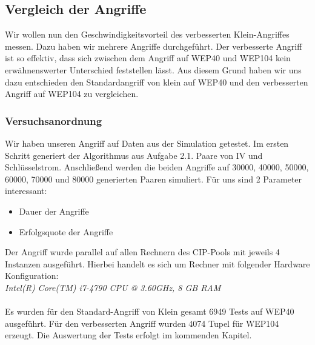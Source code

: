 \documentclass[10pt,a4paper]{article}
\begin{document}
\subsection{Vergleich der Angriffe}\label{ssec:vergleich}
Wir wollen nun den Geschwindigkeitsvorteil des verbesserten Klein-Angriffes messen. Dazu haben wir mehrere Angriffe durchgeführt. Der verbesserte Angriff ist so effektiv, dass sich zwischen dem Angriff auf WEP40 und WEP104 kein erwähnenswerter Unterschied feststellen lässt. Aus diesem Grund haben wir uns dazu entschieden den Standardangriff von klein auf WEP40 und den verbesserten Angriff auf WEP104 zu vergleichen.
\subsubsection{Versuchsanordnung}
Wir haben unseren Angriff auf Daten aus der Simulation getestet. Im ersten Schritt generiert der Algorithmus aus Aufgabe 2.1. Paare von IV und Schlüsselstrom. Anschließend werden die beiden Angriffe auf 30000, 40000, 50000, 60000, 70000 und 80000 generierten Paaren simuliert. Für uns sind 2 Parameter interessant: 
\begin{itemize}
	\item Dauer der Angriffe
	\item Erfolgsquote der Angriffe
\end{itemize}
Der Angriff wurde parallel auf allen Rechnern des CIP-Pools mit jeweils 4 Instanzen ausgeführt. Hierbei handelt es sich um Rechner mit folgender Hardware Konfiguration:\\
\textit{Intel(R) Core(TM) i7-4790 CPU @ 3.60GHz, 8 GB RAM}
\\\\
Es wurden für den Standard-Angriff von Klein gesamt 6949 Tests auf WEP40 ausgeführt. Für den verbesserten Angriff wurden 4074 Tupel für WEP104 erzeugt. 
Die Auswertung der Tests erfolgt im kommenden Kapitel.
\end{document}
